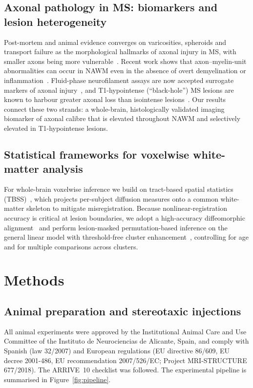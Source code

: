 \documentclass[11pt]{article}
\begin{document}
\subsection*{Axonal pathology in MS: biomarkers and lesion heterogeneity}
Post-mortem and animal evidence converges on varicosities, spheroids and transport failure as the morphological hallmarks of axonal injury in MS, with smaller axons being more vulnerable~\cite{criste2014axonal,tallantyre2010demyelinated,nikic2011reversible,bergers2002axonal}. Recent work shows that axon--myelin-unit abnormalities can occur in NAWM even in the absence of overt demyelination or inflammation~\cite{luchicchi2021axonal,teo2021nilered}. Fluid-phase neurofilament assays are now accepted surrogate markers of axonal injury~\cite{petzold2005neurofilament}, and T1-hypointense (``black-hole'') MS lesions are known to harbour greater axonal loss than isointense lesions~\cite{vanwaesberghe1999axonal,raz2015relationship}. Our results connect these two strands: a whole-brain, histologically validated imaging biomarker of axonal calibre that is elevated throughout NAWM and selectively elevated in T1-hypointense lesions.

\subsection*{Statistical frameworks for voxelwise white-matter analysis}
For whole-brain voxelwise inference we build on tract-based spatial statistics (TBSS)~\cite{smith2006tbss}, which projects per-subject diffusion measures onto a common white-matter skeleton to mitigate misregistration. Because nonlinear-registration accuracy is critical at lesion boundaries, we adopt a high-accuracy diffeomorphic alignment~\cite{klein2009evaluation} and perform lesion-masked permutation-based inference on the general linear model with threshold-free cluster enhancement~\cite{winkler2014permutation}, controlling for age and for multiple comparisons across clusters.

\section{Methods}

\subsection{Animal preparation and stereotaxic injections}
All animal experiments were approved by the Institutional Animal Care and Use Committee of the Instituto de Neurociencias de Alicante, Spain, and comply with Spanish (law 32/2007) and European regulations (EU directive 86/609, EU decree 2001-486, EU recommendation 2007/526/EC; Project MRI-STRUCTURE 677/2018). The ARRIVE~10 checklist was followed. The experimental pipeline is summarised in Figure~\ref{fig:pipeline}.
\end{document}
